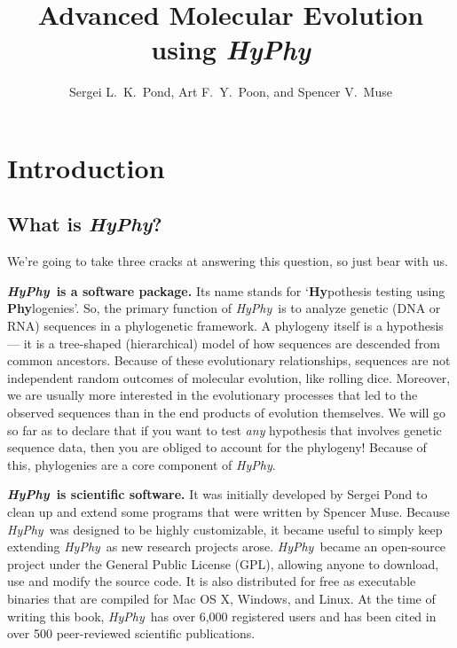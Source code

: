 \documentclass[12pt,twoside,openright]{book}
\newcommand{\hyphy}{\textit{HyPhy}}
\begin{document}
\title{Advanced Molecular Evolution using {\it HyPhy}}
\author{Sergei L.~K.~Pond, Art F.~Y.~Poon, and Spencer V.~Muse}
\date{}
\maketitle

\chapter {Introduction}

\section {What is \hyphy?}

We're going to take three cracks at answering this question, so just bear with us.

\textbf{\hyphy\ is a software package.}  Its name stands for `{\bf Hy}pothesis testing using {\bf Phy}logenies'.  So, the primary function of \hyphy\ is to analyze genetic (DNA or RNA) sequences in a phylogenetic framework.  A phylogeny itself is a hypothesis --- it is a tree-shaped (hierarchical) model of how sequences are descended from common ancestors.  Because of these evolutionary relationships, sequences are not independent random outcomes of molecular evolution, like rolling dice.  
Moreover, we are usually more interested in the evolutionary processes that led to the observed sequences than in the end products of evolution themselves.  We will go so far as to declare that if you want to test {\it any} hypothesis that involves genetic sequence data, then you are obliged to account for the phylogeny!  Because of this, phylogenies are a core component of {\it HyPhy}.

\textbf{\hyphy\ is scientific software.}  It was initially developed by Sergei Pond to clean up and extend some programs that were written by Spencer Muse.  Because \hyphy\ was designed to be highly customizable, it became useful to simply keep extending \hyphy\ as new research projects arose.  \hyphy\ became an open-source project under the General Public License (GPL), allowing anyone to download, use and modify the source code.  It is also distributed for free as executable binaries that are compiled for Mac OS X, Windows, and Linux.  At the time of writing this book, \hyphy\ has over 6,000 registered users and has been cited in over 500 peer-reviewed scientific publications.  
\end{document}
